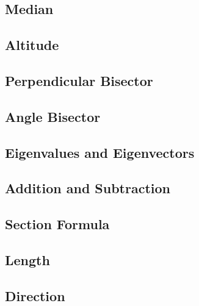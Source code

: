 \documentclass[journal]{IEEEtran}
\begin{document}
\subsection{Median}

\newpage
\subsection{Altitude}

\newpage
\subsection{Perpendicular Bisector}

\newpage
\subsection{Angle Bisector}

\newpage
\subsection{Eigenvalues and Eigenvectors}

\newpage
\subsection{Addition and Subtraction}

\newpage
\subsection{Section Formula}

%
%
%
\subsection{Length}

%
\newpage
\subsection{Direction}

\newpage
\end{document}
